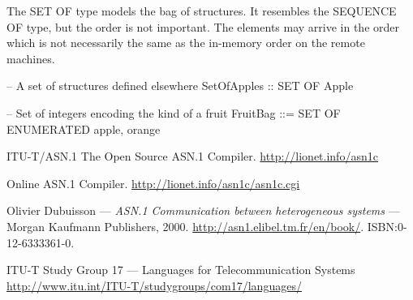 \documentclass[english,oneside,12pt]{book}
\begin{document}
The SET OF type models the bag of structures. It resembles the SEQUENCE
OF type, but the order is not important. The elements may arrive
in the order which is not necessarily the same as the in-memory order
on the remote machines.
\begin{asn}
-- A set of structures defined elsewhere
SetOfApples :: SET OF Apple

-- Set of integers encoding the kind of a fruit
FruitBag ::= SET OF ENUMERATED { apple, orange }
\end{asn}
\begin{thebibliography}{ITU-T/ASN.1}
The Open Source ASN.1 Compiler. \url{http://lionet.info/asn1c}

Online ASN.1 Compiler. \url{http://lionet.info/asn1c/asn1c.cgi}

Olivier Dubuisson --- \emph{ASN.1 Communication
between heterogeneous systems} --- Morgan Kaufmann Publishers, 2000.
\url{http://asn1.elibel.tm.fr/en/book/}. ISBN:0-12-6333361-0.

ITU-T Study Group 17 --- Languages
for Telecommunication Systems \url{http://www.itu.int/ITU-T/studygroups/com17/languages/}
\end{thebibliography}
\end{document}
